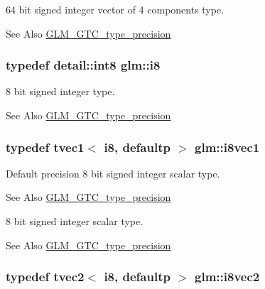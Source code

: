 64 bit signed integer vector of 4 components type. \begin{DoxySeeAlso}{See Also}
\hyperlink{group__gtc__type__precision}{G\-L\-M\-\_\-\-G\-T\-C\-\_\-type\-\_\-precision} 
\end{DoxySeeAlso}
\hypertarget{group__gtc__type__precision_gaae064be68b7d36cd7910c16e8ad18bba}{
\subsubsection[{i8}]{\setlength{\rightskip}{0pt plus 5cm}typedef detail\-::int8 {\bf glm\-::i8}}}\label{group__gtc__type__precision_gaae064be68b7d36cd7910c16e8ad18bba}
8 bit signed integer type. \begin{DoxySeeAlso}{See Also}
\hyperlink{group__gtc__type__precision}{G\-L\-M\-\_\-\-G\-T\-C\-\_\-type\-\_\-precision} 
\end{DoxySeeAlso}
\hypertarget{group__gtc__type__precision_ga1cb1ef0f2a9266aba88f161c9062cebc}{
\subsubsection[{i8vec1}]{\setlength{\rightskip}{0pt plus 5cm}typedef tvec1$<$ i8, defaultp $>$ {\bf glm\-::i8vec1}}}\label{group__gtc__type__precision_ga1cb1ef0f2a9266aba88f161c9062cebc}
Default precision 8 bit signed integer scalar type. \begin{DoxySeeAlso}{See Also}
\hyperlink{group__gtc__type__precision}{G\-L\-M\-\_\-\-G\-T\-C\-\_\-type\-\_\-precision}
\end{DoxySeeAlso}
8 bit signed integer scalar type. \begin{DoxySeeAlso}{See Also}
\hyperlink{group__gtc__type__precision}{G\-L\-M\-\_\-\-G\-T\-C\-\_\-type\-\_\-precision} 
\end{DoxySeeAlso}
\hypertarget{group__gtc__type__precision_ga277312370b6155b37dbf2a6954c42915}{
\subsubsection[{i8vec2}]{\setlength{\rightskip}{0pt plus 5cm}typedef tvec2$<$ i8, defaultp $>$ {\bf glm\-::i8vec2}}}\label{group__gtc__type__precision_ga277312370b6155b37dbf2a6954c42915}
